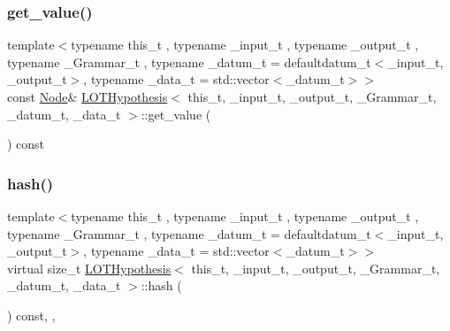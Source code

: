 \mbox{\label{class_l_o_t_hypothesis_a98da5e5ee9682d2f265017546c641c73}} 
\subsubsection{\texorpdfstring{get\+\_\+value()}{get\_value()}\hspace{0.1cm}{\footnotesize\ttfamily [2/2]}}
{\footnotesize\ttfamily template$<$typename this\+\_\+t , typename \+\_\+input\+\_\+t , typename \+\_\+output\+\_\+t , typename \+\_\+\+Grammar\+\_\+t , typename \+\_\+datum\+\_\+t  = defaultdatum\+\_\+t$<$\+\_\+input\+\_\+t, \+\_\+output\+\_\+t$>$, typename \+\_\+data\+\_\+t  = std\+::vector$<$\+\_\+datum\+\_\+t$>$$>$ \\
const \hyperlink{class_node}{Node}\& \hyperlink{class_l_o_t_hypothesis}{L\+O\+T\+Hypothesis}$<$ this\+\_\+t, \+\_\+input\+\_\+t, \+\_\+output\+\_\+t, \+\_\+\+Grammar\+\_\+t, \+\_\+datum\+\_\+t, \+\_\+data\+\_\+t $>$\+::get\+\_\+value (\begin{DoxyParamCaption}{ }\end{DoxyParamCaption}) const\hspace{0.3cm}{\ttfamily [inline]}}

\mbox{\label{class_l_o_t_hypothesis_a1157a3217d41d4c06105f1166d8c1808}} 
\subsubsection{\texorpdfstring{hash()}{hash()}}
{\footnotesize\ttfamily template$<$typename this\+\_\+t , typename \+\_\+input\+\_\+t , typename \+\_\+output\+\_\+t , typename \+\_\+\+Grammar\+\_\+t , typename \+\_\+datum\+\_\+t  = defaultdatum\+\_\+t$<$\+\_\+input\+\_\+t, \+\_\+output\+\_\+t$>$, typename \+\_\+data\+\_\+t  = std\+::vector$<$\+\_\+datum\+\_\+t$>$$>$ \\
virtual size\+\_\+t \hyperlink{class_l_o_t_hypothesis}{L\+O\+T\+Hypothesis}$<$ this\+\_\+t, \+\_\+input\+\_\+t, \+\_\+output\+\_\+t, \+\_\+\+Grammar\+\_\+t, \+\_\+datum\+\_\+t, \+\_\+data\+\_\+t $>$\+::hash (\begin{DoxyParamCaption}{ }\end{DoxyParamCaption}) const\hspace{0.3cm}{\ttfamily [inline]}, {\ttfamily [override]}, {\ttfamily [virtual]}}



